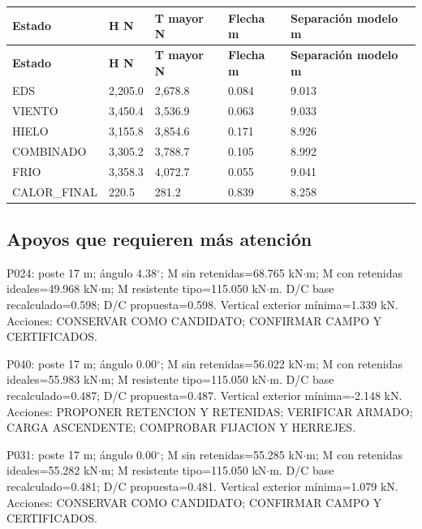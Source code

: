 \begingroup\small\setlength{\LTpre}{4pt}\setlength{\LTpost}{6pt}
\begin{longtable}{*{5}{L{\dimexpr\linewidth/5-2\tabcolsep\relax}}}
\toprule
\textbf{Estado} & \textbf{H N} & \textbf{T mayor N} & \textbf{Flecha m} & \textbf{Separación modelo m} \\ \midrule
\endfirsthead
\toprule
\textbf{Estado} & \textbf{H N} & \textbf{T mayor N} & \textbf{Flecha m} & \textbf{Separación modelo m} \\ \midrule
\endhead
EDS & 2,205.0 & 2,678.8 & 0.084 & 9.013 \\
VIENTO & 3,450.4 & 3,536.9 & 0.063 & 9.033 \\
HIELO & 3,155.8 & 3,854.6 & 0.171 & 8.926 \\
COMBINADO & 3,305.2 & 3,788.7 & 0.105 & 8.992 \\
FRIO & 3,358.3 & 4,072.7 & 0.055 & 9.041 \\
CALOR\_\allowbreak{}FINAL & 220.5 & 281.2 & 0.839 & 8.258 \\
\bottomrule\end{longtable}\endgroup

\setcounter{subsection}{6}
\subsection{Apoyos que requieren más atención}
P024: poste 17 m; ángulo 4.38\ensuremath{^\circ}; M sin retenidas=68.765 kN\ensuremath{\cdot}m; M con retenidas ideales=49.968 kN\ensuremath{\cdot}m; M resistente tipo=115.050 kN\ensuremath{\cdot}m. D/C base recalculado=0.598; D/C propuesta=0.598. Vertical exterior mínima=1.339 kN. Acciones: CONSERVAR COMO CANDIDATO; CONFIRMAR CAMPO Y CERTIFICADOS.

P040: poste 17 m; ángulo 0.00\ensuremath{^\circ}; M sin retenidas=56.022 kN\ensuremath{\cdot}m; M con retenidas ideales=55.983 kN\ensuremath{\cdot}m; M resistente tipo=115.050 kN\ensuremath{\cdot}m. D/C base recalculado=0.487; D/C propuesta=0.487. Vertical exterior mínima=-2.148 kN. Acciones: PROPONER RETENCION Y RETENIDAS; VERIFICAR ARMADO; CARGA ASCENDENTE; COMPROBAR FIJACION Y HERREJES.

P031: poste 17 m; ángulo 0.00\ensuremath{^\circ}; M sin retenidas=55.285 kN\ensuremath{\cdot}m; M con retenidas ideales=55.282 kN\ensuremath{\cdot}m; M resistente tipo=115.050 kN\ensuremath{\cdot}m. D/C base recalculado=0.481; D/C propuesta=0.481. Vertical exterior mínima=1.079 kN. Acciones: CONSERVAR COMO CANDIDATO; CONFIRMAR CAMPO Y CERTIFICADOS.

